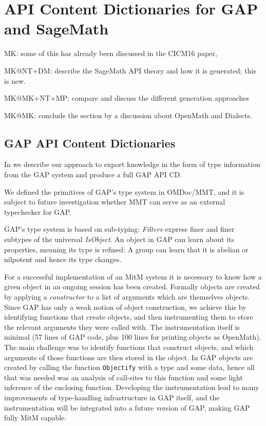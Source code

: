\section{API Content Dictionaries for GAP and SageMath}\label{sec:apit}
\begin{todolist}{MK: some of this has already been discussed in the CICM16 paper, }
\item MK@NT+DM: describe the SageMath API theory and how it is generated; this is
  new. 
\item MK@MK+NT+MP: compare and discuss the different generation approaches
\item MK@MK: conclude the section by a discussion about OpenMath and Dialects.
\end{todolist}


\subsection{GAP API Content Dictionaries}

In \cite{DehKohKon:iop16} we describe our approach to export knowledge in the
form of type information from the GAP system and produce a full GAP API CD.

We defined the primitives of GAP's type system in OMDoc/MMT, and it is
subject to future investigation whether MMT can serve as an external typechecker
for GAP.

GAP's type system is based on sub-typing: \emph{Filters} express finer and finer
subtypes of the universal \emph{IsObject}. An object in GAP can learn about its
properties, meaning its type is refined: A group can learn that it is abelian or
nilpotent and hence its type changes.

For a successful implementation of an MitM system it is necessary to know how
a given object in an ongoing session has been created. Formally objects are
created by applying a \emph{constructor} to a list of arguments which are
themselves objects.
Since GAP has only a weak notion of object construction, we achieve this by
identifying functions that create objects, and then instrumenting them to store
the relevant arguments they were called with.
The instrumentation itself is minimal (57 lines of GAP code, plus 100 lines for
printing objects as OpenMath). The main challenge was
to identify functions that construct objects, and which arguments of those
functions are then stored in the object.
In GAP objects are created by calling the function \texttt{Objectify} with a
type and some data, hence all that was needed was an analysis of call-sites to
this function and some light inference of the enclosing function.
Developing the instrumentation lead to many improvements of type-handling
infrastructure in GAP itself, and the instrumentation will be integrated into a
future version of GAP, making GAP fully MitM capable.

